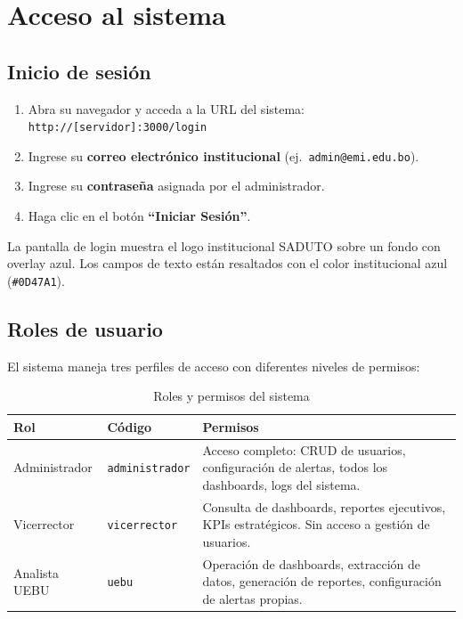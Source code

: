 \documentclass[12pt,a4paper]{article}
\begin{document}
\section{Acceso al sistema}

\subsection{Inicio de sesión}
\begin{enumerate}
  \item Abra su navegador y acceda a la URL del sistema: \texttt{http://[servidor]:3000/login}
  \item Ingrese su \textbf{correo electrónico institucional} (ej.\ \texttt{admin@emi.edu.bo}).
  \item Ingrese su \textbf{contraseña} asignada por el administrador.
  \item Haga clic en el botón \textbf{``Iniciar Sesión''}.
\end{enumerate}

\begin{infobox}
La pantalla de login muestra el logo institucional SADUTO sobre un fondo con overlay azul. Los campos de texto están resaltados con el color institucional azul (\texttt{\#0D47A1}).
\end{infobox}

\subsection{Roles de usuario}
El sistema maneja tres perfiles de acceso con diferentes niveles de permisos:

\begin{table}[H]
\centering
\begin{tabularx}{\textwidth}{l l X}
\toprule
\textbf{Rol} & \textbf{Código} & \textbf{Permisos} \\
\midrule
Administrador & \texttt{administrador} & Acceso completo: CRUD de usuarios, configuración de alertas, todos los dashboards, logs del sistema. \\
\addlinespace
Vicerrector & \texttt{vicerrector} & Consulta de dashboards, reportes ejecutivos, KPIs estratégicos. Sin acceso a gestión de usuarios. \\
\addlinespace
Analista UEBU & \texttt{uebu} & Operación de dashboards, extracción de datos, generación de reportes, configuración de alertas propias. \\
\bottomrule
\end{tabularx}
\caption{Roles y permisos del sistema}
\end{table}
\end{document}
